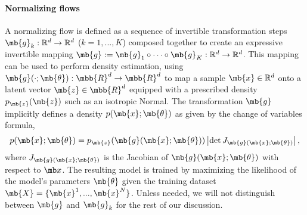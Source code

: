 \paragraph{Normalizing flows}
A normalizing flow is defined as a sequence of invertible transformation steps $\mb{g}_k : \mathbb{R}^d \to \mathbb{R}^d$  ($k=1, ..., K$)  composed together to create an expressive invertible mapping $\mb{g} := \mb{g}_1 \circ \dots \circ \mb{g}_K : \mathbb{R}^d \to \mathbb{R}^d$. %
This mapping can be used to perform density estimation, using $\mb{g}(\cdot ;\mb{\theta}): \mbb{R}^d \rightarrow \mbb{R}^d$ to map a sample $\mb{x} \in \mathbb{R}^d$ onto a latent vector $\mb{z} \in \mbb{R}^d$ equipped with a prescribed density $p_{\mb{z}}(\mb{z})$ such as an isotropic Normal.
The transformation $\mb{g}$ implicitly defines a density $p(\mb{x}; \mb{\theta})$ as given by the change of variables formula,
\begin{equation}
    p(\mb{x}; \mb{\theta}) = p_{\mb{z}}(\mb{g}(\mb{x};\mb{\theta})) \left| \det  J_{\mb{g}(\mb{x};\mb{\theta})} \right|, \label{eq:NF_DE}
\end{equation}
where $J_{\mb{g}(\mb{x};\mb{\theta})}$ is the Jacobian of $\mb{g}(\mb{x};\mb{\theta})$ with respect to $\mb x$. The resulting model is trained by maximizing the likelihood of the model's parameters $\mb{\theta}$ given the training dataset $\mb{X} = \{\mb{x}^1, ..., \mb{x}^N\}$.
Unless needed, we will not distinguish between $\mb{g}$ and $\mb{g}_k$ for the rest of our discussion.

